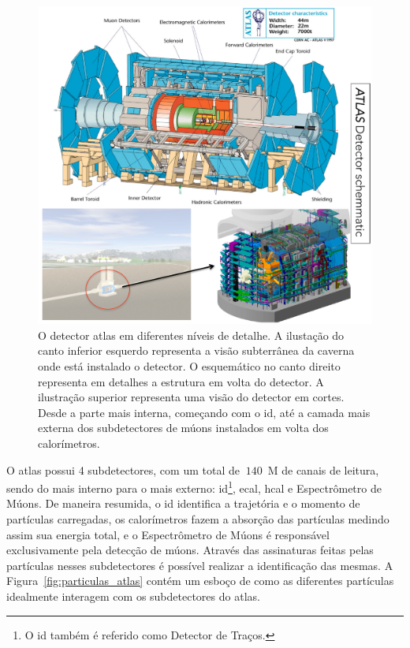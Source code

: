 \begin{figure}[h!t]
\centering
\includegraphics[width=1.1\textwidth]{figures/atlas-detector-overview.pdf}
\caption[O detector ATLAS.]{
O detector \gls{atlas} em diferentes níveis de detalhe. A ilustação do canto inferior esquerdo representa
a visão subterrânea da caverna onde está instalado o detector. O esquemático no canto direito representa
em detalhes a estrutura em volta do detector. A ilustração superior representa uma visão do detector em
cortes. Desde a parte mais interna, começando com o \gls{id}, até a camada mais externa dos subdetectores
de múons instalados em volta dos calorímetros.}
\label{fig:det_atlas}
\end{figure}


O \gls{atlas} possui 4 subdetectores, com um total de $~140$~M de canais de
leitura, sendo do mais interno para o mais externo:  \gls{id}\footnote{O \gls{id} 
também é referido como Detector de Traços.}, \gls{ecal}, \gls{hcal} e Espectrômetro 
de Múons. De maneira resumida, o \gls{id} identifica a trajetória e o momento de 
partículas carregadas, os calorímetros fazem a absorção das partículas medindo 
assim sua energia total, e o Espectrômetro de Múons é responsável exclusivamente 
pela detecção de múons. Através das assinaturas feitas pelas partículas nesses 
subdetectores é possível realizar a identificação das mesmas. A Figura~\ref{fig:particulas_atlas} 
contém um esboço de como as diferentes partículas idealmente interagem com os 
subdetectores do \gls{atlas}. 

